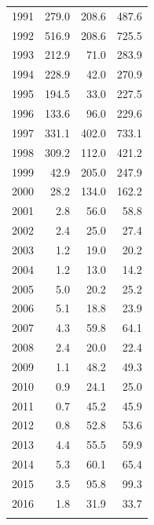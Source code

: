 \documentclass[12pt,]{article}
\begin{document}
\begin{longtable}{rrrr}
  1991 & 279.0 & 208.6 & 487.6 \\ 
  1992 & 516.9 & 208.6 & 725.5 \\ 
  1993 & 212.9 & 71.0 & 283.9 \\ 
  1994 & 228.9 & 42.0 & 270.9 \\ 
  1995 & 194.5 & 33.0 & 227.5 \\ 
  1996 & 133.6 & 96.0 & 229.6 \\ 
  1997 & 331.1 & 402.0 & 733.1 \\ 
  1998 & 309.2 & 112.0 & 421.2 \\ 
  1999 & 42.9 & 205.0 & 247.9 \\ 
  2000 & 28.2 & 134.0 & 162.2 \\ 
  2001 & 2.8 & 56.0 & 58.8 \\ 
  2002 & 2.4 & 25.0 & 27.4 \\ 
  2003 & 1.2 & 19.0 & 20.2 \\ 
  2004 & 1.2 & 13.0 & 14.2 \\ 
  2005 & 5.0 & 20.2 & 25.2 \\ 
  2006 & 5.1 & 18.8 & 23.9 \\ 
  2007 & 4.3 & 59.8 & 64.1 \\ 
  2008 & 2.4 & 20.0 & 22.4 \\ 
  2009 & 1.1 & 48.2 & 49.3 \\ 
  2010 & 0.9 & 24.1 & 25.0 \\ 
  2011 & 0.7 & 45.2 & 45.9 \\ 
  2012 & 0.8 & 52.8 & 53.6 \\ 
  2013 & 4.4 & 55.5 & 59.9 \\ 
  2014 & 5.3 & 60.1 & 65.4 \\ 
  2015 & 3.5 & 95.8 & 99.3 \\ 
  2016 & 1.8 & 31.9 & 33.7 \\ 
   \hline
\hline
\label{tab:Southern_catch}
\end{longtable}
\end{document}
